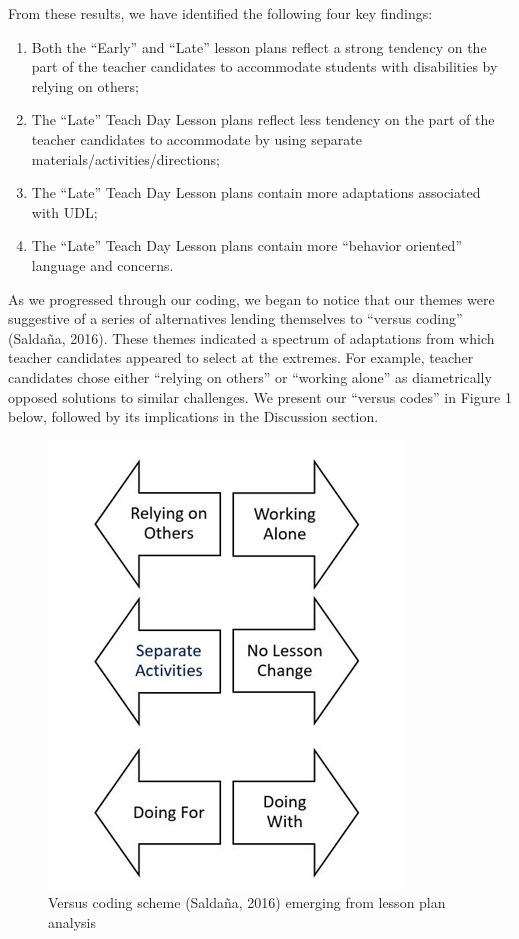 \documentclass[11.5pt]{sig-alternate} %
\begin{document}
\begin{large}
\begin{table}[htpb]
\begin{tabular}{llc}
\end{tabular}
\end{table}
From these results, we have identified the following four key findings:
	
\begin{enumerate}[nosep]
    \item Both the “Early” and  “Late” lesson plans reflect a strong tendency on the part of the teacher candidates to accommodate students with disabilities by relying on others;
    \item The “Late” Teach Day Lesson plans reflect less tendency on the part of the teacher candidates to accommodate by using separate materials/activities/directions;
    \item The “Late” Teach Day Lesson plans contain more adaptations associated with UDL;
    \item The “Late” Teach Day Lesson plans contain more “behavior oriented” language and concerns.
\end{enumerate}
           
As we progressed through our coding, we began to notice that our themes were suggestive of a series of alternatives lending themselves to “versus coding” (Saldaña, 2016).  These themes indicated a spectrum of adaptations from which teacher candidates appeared to select at the extremes.  For example, teacher candidates chose either “relying on others” or “working alone” as diametrically opposed solutions to similar challenges.  We present our “versus codes” in Figure 1 below, followed by its implications in the Discussion section.  
 
\begin{figure}[h]
    \centering
    \includegraphics[width=0.7\linewidth]{images/fig1.jpg}
    \caption{ Versus coding scheme (Saldaña, 2016) emerging from lesson plan analysis}
\end{figure}


\end{large}
\end{document}
